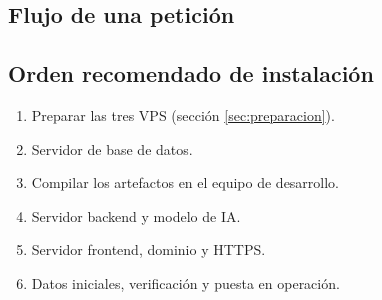 \subsection{Flujo de una petición}

\subsection{Orden recomendado de instalación}
\begin{enumerate}
  \item Preparar las tres VPS (sección \ref{sec:preparacion}).
  \item Servidor de base de datos.
  \item Compilar los artefactos en el equipo de desarrollo.
  \item Servidor backend y modelo de IA.
  \item Servidor frontend, dominio y HTTPS.
  \item Datos iniciales, verificación y puesta en operación.
\end{enumerate}
